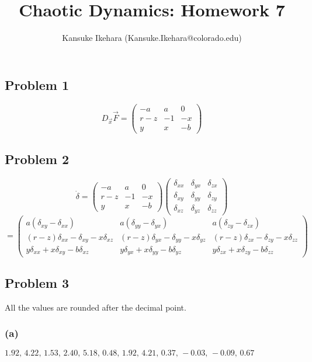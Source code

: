 \documentclass{article}
\title{Chaotic Dynamics: Homework 7}
\author{Kansuke Ikehara (Kansuke.Ikehara@colorado.edu)}
\begin{document}
\maketitle

\subsection*{Problem 1}
\[
	D_{\vec{x}}\vec{F} = 
	\left( 
	\begin{array}{ccc}
		-a & a & 0 \\
		r-z & -1 & -x \\
		y & x & -b 
	\end{array}
	 \right)
\]

\subsection*{Problem 2}
\[
	\dot\delta = \left( 
	\begin{array}{ccc}
		-a & a & 0 \\
		r-z & -1 & -x \\
		y & x & -b 
	\end{array}
	 \right)
	 \left( 
	\begin{array}{ccc}
		\delta_{xx} & \delta_{yx} & \delta_{zx} \\
		\delta_{xy} & \delta_{yy} & \delta_{zy} \\
		\delta_{xz} & \delta_{yz} & \delta_{zz}
	\end{array}
	 \right)
\]
\[
	 =
	  \left( 
	\begin{array}{ccc}
		a(\delta_{xy} - \delta_{xx}) & a(\delta_{yy} - \delta_{yx})  & a(\delta_{zy} - \delta_{zx})  \\
		(r-z)\delta_{xx} - \delta_{xy} -x\delta_{xz} & (r-z)\delta_{yx} - \delta_{yy} -x\delta_{yz} & (r-z)\delta_{zx} - \delta_{zy} -x\delta_{zz} \\
		y\delta_{xx} + x\delta_{xy} -b\delta_{xz} & y\delta_{yx} + x\delta_{yy} -b\delta_{yz} & y\delta_{zx} + x\delta_{zy} -b\delta_{zz}
	\end{array}
	 \right)
\]

\subsection*{Problem 3}
All the values are rounded after the decimal point.
\subsubsection*{(a)}
$1.92,\, 4.22, \,1.53, \,2.40,\, 5.18,\, 0.48,\, 1.92,\, 4.21,\, 0.37,\, -0.03,\, -0.09, \,0.67$
\end{document}
